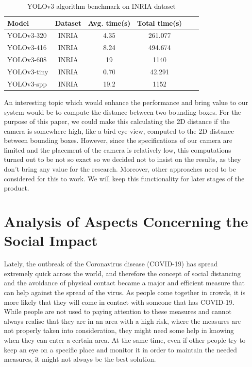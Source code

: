 \documentclass[runningheads,a4paper,11pt]{report}
\begin{document}
\begin{table}[htbp]
	\caption{YOLOv3 algorithm benchmark on INRIA dataset}
	\label{tab3INRIA}
		\begin{center}
			\begin{tabular}{p{100pt}c c c c c}

				\textbf{Model}& \textbf{Dataset}& \textbf{Avg. time(s)}& \textbf{Total time(s)} \\
				\hline\hline
 				YOLOv3-320& INRIA& 4.35& 261.077\\
 				YOLOv3-416& INRIA& 8.24& 494.674\\
 				YOLOv3-608& INRIA& 19& 1140\\
 				YOLOv3-tiny& INRIA& 0.70& 42.291\\
 				YOLOv3-spp& INRIA& 19.2& 1152\\
			\end{tabular}
		\end{center}
\end{table}

An interesting topic which would enhance the performance and bring value to our system would be to compute the distance between two bounding boxes. For the purpose of this paper, we could make this calculating the 2D distance if the camera is somewhere high, like a bird-eye-view, computed to the 2D distance between bounding boxes. However, since the specifications of our camera are limited and the placement of the camera is relatively low, this computations turned out to be not so exact so we decided not to insist on the results, as they don't bring any value for the research. Moreover, other approaches need to be considered for this to work. We will keep this functionality for later stages of the product.

\section{Analysis of Aspects Concerning the Social Impact}
\label{section:social}

Lately, the outbreak of the Coronavirus disease (COVID-19) has spread extremely quick across the world, and therefore the concept of social distancing and the avoidance of physical contact became a major and efficient measure that can help against the spread of the virus. As people come together in crowds, it is more likely that they will come in contact with someone that has COVID-19. While people are not used to paying attention to these measures and cannot always realise that they are in an area with a high risk, where the measures are not properly taken into consideration, they might need some help in knowing when they can enter a certain area. At the same time, even if other people try to keep an eye on a specific place and monitor it in order to maintain the needed measures, it might not always be the best solution.
\end{document}
